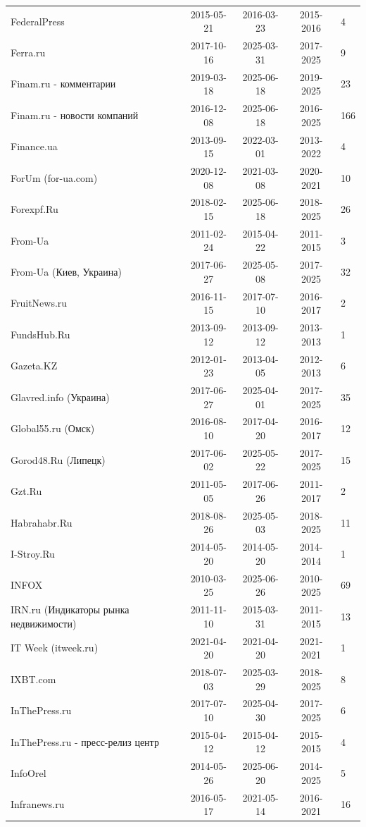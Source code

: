 \begin{longtable}{p{6cm}cccp{2cm}}
FederalPress & 2015-05-21 & 2016-03-23 & 2015-2016 & 4\\
Ferra.ru & 2017-10-16 & 2025-03-31 & 2017-2025 & 9\\
Finam.ru - комментарии & 2019-03-18 & 2025-06-18 & 2019-2025 & 23\\
Finam.ru - новости компаний & 2016-12-08 & 2025-06-18 & 2016-2025 & 166\\
Finance.ua & 2013-09-15 & 2022-03-01 & 2013-2022 & 4\\
ForUm (for-ua.com) & 2020-12-08 & 2021-03-08 & 2020-2021 & 10\\
Forexpf.Ru & 2018-02-15 & 2025-06-18 & 2018-2025 & 26\\
From-Ua & 2011-02-24 & 2015-04-22 & 2011-2015 & 3\\
From-Ua (Киев, Украина) & 2017-06-27 & 2025-05-08 & 2017-2025 & 32\\
FruitNews.ru & 2016-11-15 & 2017-07-10 & 2016-2017 & 2\\
FundsHub.Ru & 2013-09-12 & 2013-09-12 & 2013-2013 & 1\\
Gazeta.KZ & 2012-01-23 & 2013-04-05 & 2012-2013 & 6\\
Glavred.info (Украина) & 2017-06-27 & 2025-04-01 & 2017-2025 & 35\\
Global55.ru (Омск) & 2016-08-10 & 2017-04-20 & 2016-2017 & 12\\
Gorod48.Ru (Липецк) & 2017-06-02 & 2025-05-22 & 2017-2025 & 15\\
Gzt.Ru & 2011-05-05 & 2017-06-26 & 2011-2017 & 2\\
Habrahabr.Ru & 2018-08-26 & 2025-05-03 & 2018-2025 & 11\\
I-Stroy.Ru & 2014-05-20 & 2014-05-20 & 2014-2014 & 1\\
INFOX & 2010-03-25 & 2025-06-26 & 2010-2025 & 69\\
IRN.ru (Индикаторы рынка недвижимости) & 2011-11-10 & 2015-03-31 & 2011-2015 & 13\\
IT Week (itweek.ru) & 2021-04-20 & 2021-04-20 & 2021-2021 & 1\\
IXBT.com & 2018-07-03 & 2025-03-29 & 2018-2025 & 8\\
InThePress.ru & 2017-07-10 & 2025-04-30 & 2017-2025 & 6\\
InThePress.ru - пресс-релиз центр & 2015-04-12 & 2015-04-12 & 2015-2015 & 4\\
InfoOrel & 2014-05-26 & 2025-06-20 & 2014-2025 & 5\\
Infranews.ru & 2016-05-17 & 2021-05-14 & 2016-2021 & 16\\

\end{longtable}
